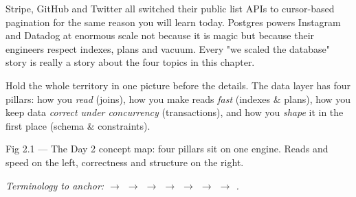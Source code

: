  Stripe, GitHub and Twitter all switched their public list APIs to cursor-based pagination for the same reason you will learn today. Postgres powers Instagram and Datadog at enormous scale not because it is magic but because their engineers respect indexes, plans and vacuum. Every "we scaled the database" story is really a story about the four topics in this chapter.


Hold the whole territory in one picture before the details. The data layer has four pillars: how you \emph{read} (joins), how you make reads \emph{fast} (indexes \& plans), how you keep data \emph{correct under concurrency} (transactions), and how you \emph{shape} it in the first place (schema \& constraints).

\begin{wbfigure}{Fig 2.1 — The Day 2 concept map: four pillars sit on one engine. Reads and speed on the left, correctness and structure on the right.}
\end{wbfigure}

\begin{center}\small\itshape\color{cInk!70}
Terminology to anchor:  $\rightarrow$  $\rightarrow$  $\rightarrow$  $\rightarrow$  $\rightarrow$  $\rightarrow$  $\rightarrow$ .
\end{center}

